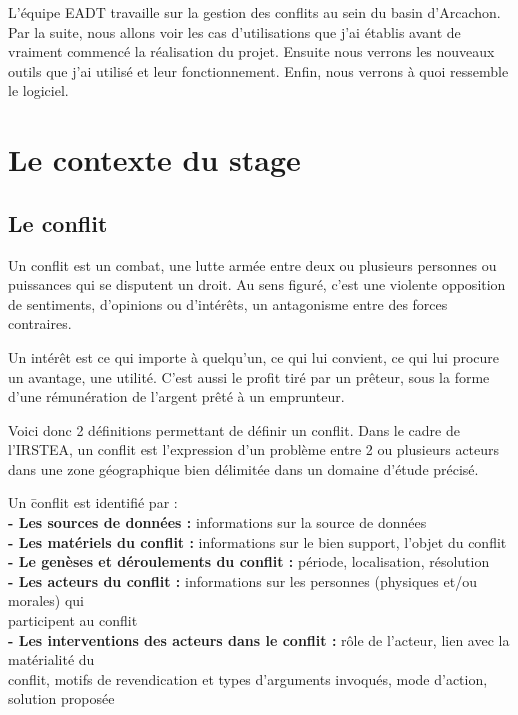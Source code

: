 \documentclass[12pt,a4paper,titlepage,twoside]{report}
\begin{document}
L'équipe EADT travaille sur la gestion des conflits au sein du basin d'Arcachon. Par la suite, nous allons voir les cas d'utilisations que j'ai établis avant de vraiment commencé la réalisation du projet. Ensuite nous verrons les nouveaux outils que j'ai utilisé et leur fonctionnement. Enfin, nous verrons à quoi ressemble le logiciel. 


\cleardoublepage
\chapter{Le contexte du stage}
\section{Le conflit}
Un conflit est un combat, une lutte armée entre deux ou plusieurs personnes ou puissances qui se disputent un droit. Au sens figuré, c'est une violente opposition de sentiments, d'opinions ou d'intérêts, un antagonisme entre des forces contraires. \newline

Un intérêt est ce qui importe à quelqu'un, ce qui lui convient, ce qui lui procure un avantage, une utilité. C'est aussi le profit tiré par un prêteur, sous la forme d'une rémunération de l'argent prêté à un emprunteur.\newline

Voici donc 2 définitions permettant de définir un conflit.
Dans le cadre de l'IRSTEA, un conflit est l'expression d'un problème entre 2 ou plusieurs acteurs dans une zone géographique bien délimitée dans un domaine d'étude précisé. 

\begin{tabbing}
Un \= conflit est identifié par : \\
\> \textbf{- Les sources de données :} informations sur la source de données \\
\> \textbf{- Les matériels du conflit :} informations sur le bien support, l'objet du conflit \\
\> \textbf{- Le genèses et déroulements du conflit :} période, localisation, résolution \\
\> \textbf{- Les acteurs du conflit :} informations sur les personnes (physiques et/ou morales) qui \\
\> participent au conflit \\
\> \textbf{- Les interventions des acteurs dans le conflit :} rôle de l'acteur, lien avec la matérialité du \\ 
\> conflit, motifs de revendication et types d'arguments invoqués, mode d'action, solution proposée \\
\end{tabbing}
\end{document}
